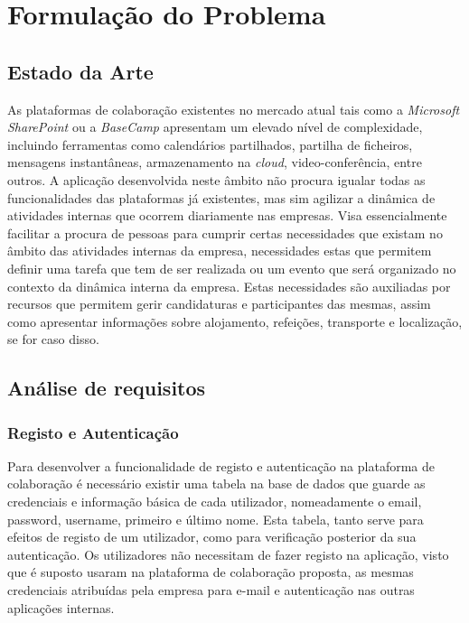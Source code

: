 \chapter{Formulação do Problema}\label{chapter:formulacaoDoProblema}

\section{Estado da Arte}\label{sec:estadoDaArte}
As plataformas de colaboração existentes no mercado atual tais como a \textit{Microsoft SharePoint} ou a \textit{BaseCamp} apresentam um elevado nível de complexidade, 
incluindo ferramentas como calendários partilhados, partilha de ficheiros, mensagens instantâneas, armazenamento na \textit{cloud}, video-conferência, entre outros. 
A aplicação desenvolvida neste âmbito não procura igualar todas as funcionalidades das plataformas já existentes, 
mas sim agilizar a dinâmica de atividades internas que ocorrem diariamente nas empresas. 
Visa essencialmente facilitar a procura de pessoas para cumprir certas necessidades que existam no âmbito das atividades internas da empresa, 
necessidades estas que permitem definir uma tarefa que tem de ser realizada ou um evento que será organizado no contexto da dinâmica interna da empresa. 
Estas necessidades são auxiliadas por recursos que permitem gerir candidaturas e participantes das mesmas, 
assim como apresentar informações sobre alojamento, refeições, transporte e localização, se for caso disso.

\section{Análise de requisitos}\label{sec:requisitos}

\subsection{Registo e Autenticação}\label{subsec:login}
Para desenvolver a funcionalidade de registo e autenticação na plataforma de colaboração é necessário existir uma tabela 
na base de dados que guarde as credenciais e informação básica de cada utilizador, nomeadamente 
o email, password, username, primeiro e último nome. 
Esta tabela, tanto serve para efeitos de registo de um utilizador, como para verificação posterior da sua autenticação. 
Os utilizadores não necessitam de fazer registo na aplicação, visto que é suposto usaram na plataforma de colaboração proposta, 
as mesmas credenciais atribuídas pela empresa para e-mail e autenticação nas outras aplicações internas.

